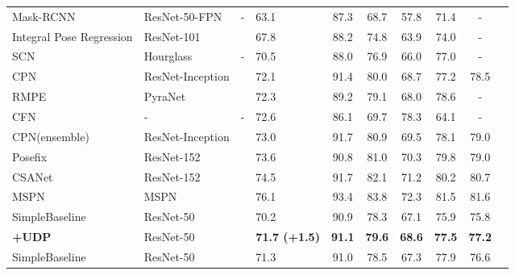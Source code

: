 \documentclass[10pt,journal,compsoc]{IEEEtran}
\begin{document}
\begin{table*}
\begin{center}
\begin{tabular}{l|l|c|lcccccc}
\hline
Mask-RCNN\cite{Mask-RCNN}          & ResNet-50-FPN\cite{FPN}    &-          &63.1 & 87.3             & 68.7             & 57.8                   &71.4                   &-   \\
Integral Pose Regression\cite{IPR} & ResNet-101\cite{Resnet}&&67.8 & 88.2             & 74.8             & 63.9                   &74.0                   &-   \\
SCN\cite{SCN}                      & Hourglass\cite{Hourglass}  &-          &70.5 & 88.0             & 76.9             & 66.0                   &77.0                   &-   \\
CPN\cite{CPN}                      & ResNet-Inception &       &72.1 & 91.4             & 80.0             & 68.7                   &77.2                   &78.5\\
RMPE\cite{RMPE}                    & PyraNet\cite{PyraNet}&  &72.3 & 89.2             & 79.1             & 68.0                   &78.6                   &-   \\
CFN\cite{CFN}                      & -                &-                    &72.6 & 86.1             & 69.7             & 78.3                   &64.1                   &-   \\
CPN(ensemble)\cite{CPN}            & ResNet-Inception &      &73.0 & 91.7             & 80.9             & 69.5                   &78.1                   &79.0\\
Posefix\cite{Posefix}              & ResNet-152       &       &73.6 & 90.8             & 81.0             & 70.3                   &79.8                   &79.0\\
CSANet\cite{CSANet}                & ResNet-152       &       &74.5 & 91.7             & 82.1             & 71.2                   &80.2                   &80.7\\
MSPN\cite{MSPN}                    & MSPN\cite{MSPN}  &       &76.1 & 93.4             & 83.8             & 72.3                   &81.5                   &81.6\\
\hline
SimpleBaseline\cite{CPN}           & ResNet-50     &       &70.2      & 90.9             & 78.3             & 67.1            &75.9            &75.8\\
\textbf{+UDP}                                         & ResNet-50     &       &\textbf{71.7 (+1.5)}    &\textbf{91.1}           &\textbf{79.6}           &\textbf{68.6}         &\textbf{77.5}          &\textbf{77.2}\\
SimpleBaseline\cite{CPN}           & ResNet-50     &       &71.3      & 91.0             & 78.5             & 67.3            &77.9            &76.6\\

\end{tabular}
\end{center}
\end{table*}
\end{document}
